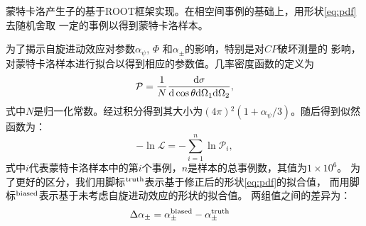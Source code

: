 蒙特卡洛产生子的基于ROOT\cite{ROOT}框架实现。在相空间事例的基础上，用形状\ref{eq:pdf}去随机舍取
一定的事例以得到蒙特卡洛样本。

为了揭示自旋进动效应对参数$\alpha_{\psi}$, $\Phi$ 和$\alpha_{\pm}$的影响，特别是对$CP$破坏测量的
影响， 对蒙特卡洛样本进行拟合以得到相应的参数值。几率密度函数的定义为
\begin{equation}
    \mathcal{P} = \frac{1}{N} \frac{{\rm d} \sigma}
    {{\rm d } \cos\theta {\rm d} \Omega_1 {\rm d} \Omega_2},
\end{equation}
式中$N$是归一化常数。经过积分得到其大小为$(4\pi){}^{2}(1 + \alpha_{\psi}/3)$。随后得到似然函数为：
\begin{equation}
    - \ln\mathcal{L} = -\sum_{i=1}^{n} \ln \mathcal{P}_{i},
\end{equation}
式中$i$代表蒙特卡洛样本中的第$i$个事例，$n$是样本的总事例数，其值为$1 \times 10^{6}$。
为了更好的区分，我们用脚标${}^{\rm truth}$表示基于修正后的形状\ref{eq:pdf}的拟合值，
而用脚标${}^{\rm biased}$表示基于未考虑自旋进动效应的形状的拟合值。
两组值之间的差异为：
\begin{equation}
    \begin{aligned}
        \Delta \alpha_{\pm} & = \alpha_{\pm}^{\rm biased} - \alpha_{\pm}^{\rm truth} 
    \end{aligned}
\end{equation}

